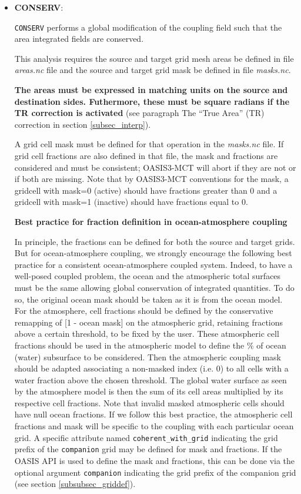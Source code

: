 \begin{itemize}

\item {\bf CONSERV}:

  {\tt CONSERV} performs a global modification of the coupling field such
  that the area integrated fields are conserved.
 
  This analysis requires the source and target grid mesh areas be
  defined in file {\it areas.nc} file and the source and target grid
  mask be defined in file {\it masks.nc}.

  {\bf The areas must be expressed in matching units
  on the source and destination sides. Futhermore, these must be square radians if the TR correction is activated} (see paragraph The ``True Area'' (TR) correction in section \ref{subsec_interp}). 
  
  A grid cell mask must be defined for that operation in the {\it
    masks.nc} file. If grid cell fractions are also defined in that file, the mask
  and fractions are considered and must be consistent; OASIS3-MCT will abort if
  they are not or if both are missing.  Note that by OASIS3-MCT
  conventions for the mask, a gridcell with mask=0 (active) should
  have fractions greater than 0 and a gridcell with mask=1 (inactive)
  should have fractions equal to 0.  
  
 {\bf Best practice for fraction definition in ocean-atmosphere coupling}
 
 In principle, the fractions can be defined for both the source and target grids. But for ocean-atmosphere coupling, we strongly encourage the following best practice for a consistent ocean-atmosphere coupled system. Indeed, to have a well-posed coupled problem, the ocean and the atmospheric total surfaces must be the same allowing global conservation of integrated quantities. To do so, the original ocean mask should be taken as it is from the ocean model. For the atmosphere, cell fractions should be defined by the conservative remapping of [1 - ocean mask] on the atmospheric grid, retaining fractions above a certain threshold, to be fixed by the user. These atmospheric cell fractions should be used in the atmospheric model to define the \% of ocean (water) subsurface to be considered. Then the atmospheric coupling mask should be adapted associating a non-masked index (i.e. 0) to all cells with a water fraction above the chosen threshold. The global water surface as seen by the atmosphere model is then the sum of its cell areas multiplied by its respective cell fractions. Note that invalid masked atmospheric cells should have null ocean fractions.
If we follow this best practice, the atmospheric cell fractions and mask will be specific to the coupling with each particular ocean grid. A specific attribute named {\tt coherent\_with\_grid} indicating the grid prefix of the {\tt companion} grid may be defined for mask and fractions. If the OASIS API is used to define the mask and fractions, this can be done via the optional argument {\tt companion} indicating the grid prefix of the companion grid (see section \ref{subsubsec_griddef}).
  

\end{itemize}
